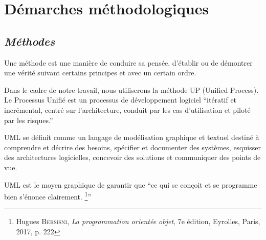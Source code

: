     \section[Démarches méthodologiques]{Démarches méthodologiques}
        \subsection[Méthodes]{\textit{Méthodes}}
        Une méthode est une manière de conduire sa pensée, d’établir ou de démontrer une
        vérité suivant certains principes et avec un certain ordre.
        \par
        Dans le cadre de notre travail, nous utiliserons la méthode UP (Unified Process).
        Le Processus Unifié est un processus de développement logiciel \enquote{itératif et incrémental,
        centré sur l’architecture, conduit par les cas d’utilisation et piloté par les risques.} \cite{Roques2008}
        \par
        UML se définit comme un langage de modélisation graphique et textuel destiné à
        comprendre et décrire des besoins, spécifier et documenter des systèmes, esquisser des
        architectures logicielles, concevoir des solutions et communiquer des points de vue. \cite{RoqVall2007}
        \par
        UML est le moyen graphique de garantir que \enquote{ce qui se conçoit et se programme
        bien s’énonce clairement. \footnote[2]{Hugues \textsc{Bersisni}, \textit{La programmation orientée objet}, 7e édition, Eyrolles, Paris, 2017, p. 222}}

